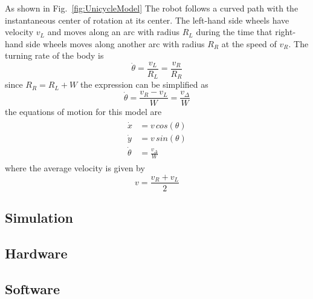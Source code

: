 As shown in Fig.~\ref{fig:UnicycleModel} The robot follows a curved path with the instantaneous center of rotation at its center. 
The left-hand side wheels have velocity $v_L$ and moves along an arc with radius $R_L$ during the time that right-hand side wheels moves along another arc with radius $R_R$ at the speed of $v_R$. 
The turning rate of the body is
        \begin{equation*}
            \dot{\theta}= \frac{v_L}{R_L} = \frac{v_R}{R_R}
        \end{equation*}
        since $R_R = R_L + W$ the expression can be simplified as
        \begin{equation}
            \dot{\theta}= \frac{v_R - v_L}{W} = \frac{v_\Delta}{W}\label{eq:ThetaDot3}
        \end{equation}
        the equations of motion for this model are
        \begin{eqnarray}
            \begin{aligned}
                \dot{x} &= v\,cos(\theta)\\
                \dot{y} &= v\,sin(\theta)\\
                \dot{\theta} &= \frac{v_\Delta}{W}
            \end{aligned}
            \label{eq:MotionEq3}
        \end{eqnarray}
        where the average velocity\parencite{Corke2011} is given by
        \begin{equation}
            v = \frac{v_R + v_L}{2} 
            \label{eq:av_velocity}
        \end{equation}{} 


\subsection{Simulation}

\subsection{Hardware}

\subsection{Software}
